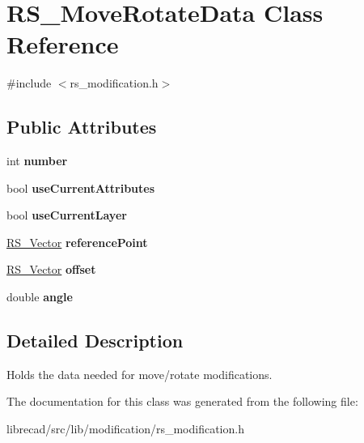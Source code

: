 \hypertarget{classRS__MoveRotateData}{\section{R\-S\-\_\-\-Move\-Rotate\-Data Class Reference}
\label{classRS__MoveRotateData}
}


{\ttfamily \#include $<$rs\-\_\-modification.\-h$>$}

\subsection*{Public Attributes}
\begin{DoxyCompactItemize}
\item 
\hypertarget{classRS__MoveRotateData_a26b3926e8d2b558722bfe24986d9c87c}{int {\bfseries number}}\label{classRS__MoveRotateData_a26b3926e8d2b558722bfe24986d9c87c}

\item 
\hypertarget{classRS__MoveRotateData_a264625f40df5685c20ba3d45e1452faa}{bool {\bfseries use\-Current\-Attributes}}\label{classRS__MoveRotateData_a264625f40df5685c20ba3d45e1452faa}

\item 
\hypertarget{classRS__MoveRotateData_acbe7fff3585aec6959f437df487318d1}{bool {\bfseries use\-Current\-Layer}}\label{classRS__MoveRotateData_acbe7fff3585aec6959f437df487318d1}

\item 
\hypertarget{classRS__MoveRotateData_a4f584b84c8a6ac496e855137623820aa}{\hyperlink{classRS__Vector}{R\-S\-\_\-\-Vector} {\bfseries reference\-Point}}\label{classRS__MoveRotateData_a4f584b84c8a6ac496e855137623820aa}

\item 
\hypertarget{classRS__MoveRotateData_ac1f4e380c21621e5db2ec0c2f51d2cca}{\hyperlink{classRS__Vector}{R\-S\-\_\-\-Vector} {\bfseries offset}}\label{classRS__MoveRotateData_ac1f4e380c21621e5db2ec0c2f51d2cca}

\item 
\hypertarget{classRS__MoveRotateData_a7acae732da2044469f4d0c47f88ba444}{double {\bfseries angle}}\label{classRS__MoveRotateData_a7acae732da2044469f4d0c47f88ba444}

\end{DoxyCompactItemize}


\subsection{Detailed Description}
Holds the data needed for move/rotate modifications. 

The documentation for this class was generated from the following file\-:\begin{DoxyCompactItemize}
\item 
librecad/src/lib/modification/rs\-\_\-modification.\-h\end{DoxyCompactItemize}
